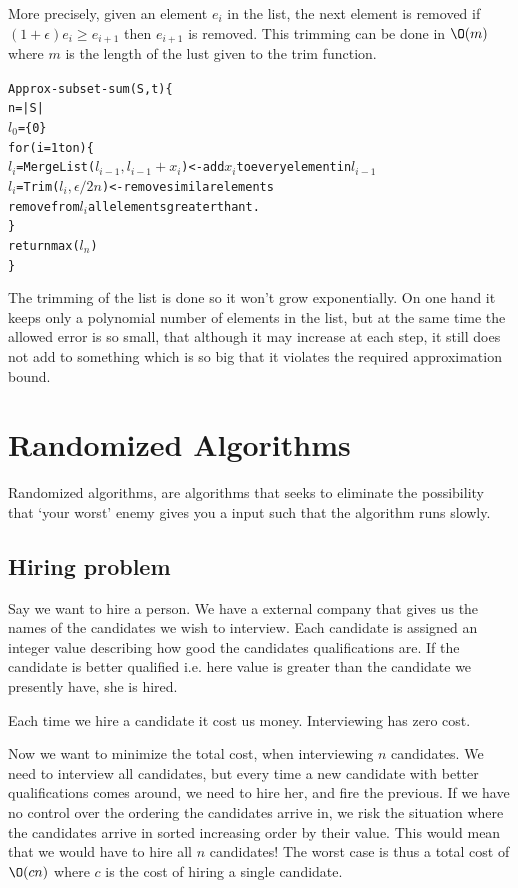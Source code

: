 \documentclass[10pt]{article}
\begin{document}
More precisely, given an element $e_i$ in the list, the next element is removed if $(1+\epsilon)e_i\geq e_{i+1}$ then $e_{i+1}$ is removed. This trimming can be done in $\O(m)$ where $m$ is the length of the lust given to the trim function.

\begin{alltt}
Approx-subset-sum(S,t)\{
  n = |S|
  \(l_0\) = \{0\}
  for(i=1 to n)\{
    \(l_i\) = MergeList(\(l_{i-1},l_{i-1}+x_i\))  <- add \(x_i\) to every element in \(l_{i-1}\)
    \(l_i\) = Trim(\(l_{i},\epsilon/2n\))            <- remove similar elements
    remove from \(l_i\) all elements greater than t.
  \}
  return max(\(l_n\))
\}  
\end{alltt}

The trimming of the list is done so it won't grow exponentially. On one hand it keeps only a polynomial number of elements in the list, but at the same time the allowed error is so small, that although it may increase at each step, it still does not add to something which is so big that it violates the required approximation bound.




\clearpage \newpage
\section{Randomized Algorithms} %
\label{sec:randomized_algoritms}
Randomized algorithms, are algorithms that seeks to eliminate the possibility that `your worst' enemy gives you a input such that the algorithm runs slowly.

\subsection{Hiring problem} %
\label{sub:hiring_problem}
Say we want to hire a person. We have a external company that gives us the names of the candidates we wish to interview. Each candidate is assigned an integer value describing how good the candidates qualifications are. If the candidate is better qualified i.e. here value is greater than the candidate we presently have, she is hired.

Each time we hire a candidate it cost us money. Interviewing has zero cost.

Now we want to minimize the total cost, when interviewing $n$ candidates. We need to interview all candidates, but every time a new candidate with better qualifications comes around, we need to hire her, and fire the previous. If we have no control over the ordering the candidates arrive in, we risk the situation where the candidates arrive in sorted increasing order by their value. This would mean that we would have to hire all $n$ candidates! The worst case is thus a total cost of $\O(cn)$ where $c$ is the cost of hiring a single candidate.
\end{document}
